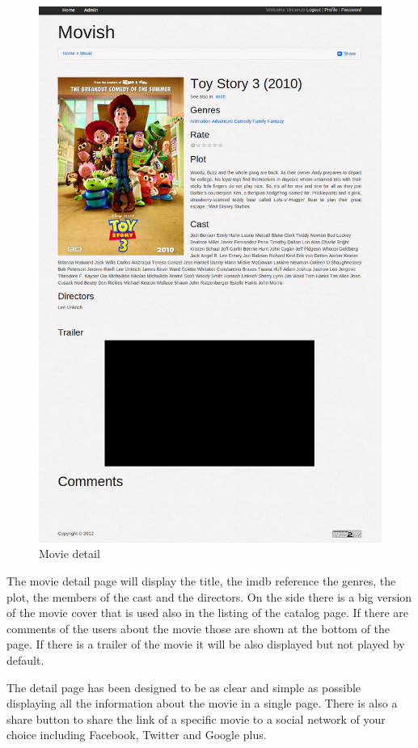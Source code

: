 \begin{figure}
  \centering
  \includegraphics[width=\textwidth]{figures/movie-detail.png}
  \caption{Movie detail}
  \label{fig:movie_detail}
\end{figure}

The movie detail page will display the title, the imdb reference the genres, the plot, the members of the cast and the directors. On the side there is a big version of the movie cover that is used also in the listing of the catalog page. If there are comments of the users about the movie those are shown at the bottom of the page. If there is a trailer of the movie it will be also displayed but not played by default.

The detail page has been designed to be as clear and simple as possible displaying all the information about the movie in a single page. There is also a share button to share the link of a specific movie to a social network of your choice including Facebook, Twitter and Google plus.

